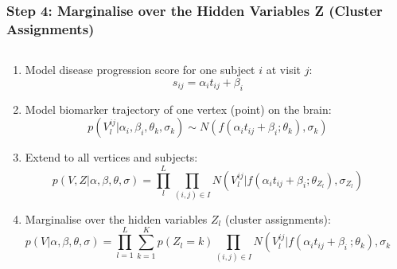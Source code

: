 \documentclass[8pt,xcolor=table]{beamer}
\begin{document}
\begin{frame}
\frametitle{Step 4: Marginalise over the Hidden Variables Z (Cluster Assignments)}

\begin{columns}[T]
    \begin{column}{.7\textwidth} %
   
     
   \begin{enumerate}      
      
      \item Model disease progression score for one subject $i$ at visit $j$:
      $$s_{ij} = \alpha_i t_{ij} + \beta_i$$
      
      \vspace{1em}
      
      \item Model biomarker trajectory of one vertex (point) on the brain:
      $$p(V_l^{ij} | \alpha_i, \beta_i, \theta_k, \sigma_k) \sim N(f(\alpha_i t_{ij} + \beta_i ; \theta_k), \sigma_k)$$
      
      \vspace{1em}
      
      \item Extend to all vertices and subjects:
  $$  p(V, Z | \alpha, \beta, \theta, \sigma) = \prod_l^L \prod_{(i,j) \in I} N(V_l^{ij} | f(\alpha_i t_{ij} + \beta_i ; \theta_{Z_l}), \sigma_{Z_l}) $$

      \vspace{1em}
  
      \item Marginalise over the hidden variables $Z_l$ (cluster assignments):
  \small{$$p(V|\alpha, \beta, \theta, \sigma) = \prod_{l=1}^L \sum_{k=1}^K p(Z_l = k) \prod_{(i,j) \in I} N(V_l^{ij} | f(\alpha_i t_{ij} + \beta_i \ ; \theta_k), \sigma_k)$$}
     
     \end{enumerate}
     

    \end{column}
    \begin{column}{.3\textwidth}


\end{column}
\end{columns}
\end{frame}
\end{document}
